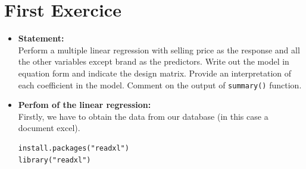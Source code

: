 \documentclass{article}
\begin{document}
\section{First Exercice}
\begin{itemize}
    \item \textbf{Statement:}\\ 
Perform a multiple linear regression with selling price as the response and
all the other variables except brand as the predictors. Write out the model
in equation form and indicate the design matrix. Provide an interpretation
of each coefficient in the model. Comment on the output of \texttt{summary()} function.
    \item \textbf{Perfom of the linear regression:} \\
Firstly, we have to obtain the data from our database (in this case a document excel).
\begin{verbatim}
install.packages("readxl")
library("readxl")


\end{verbatim}
\end{itemize}
\end{document}

